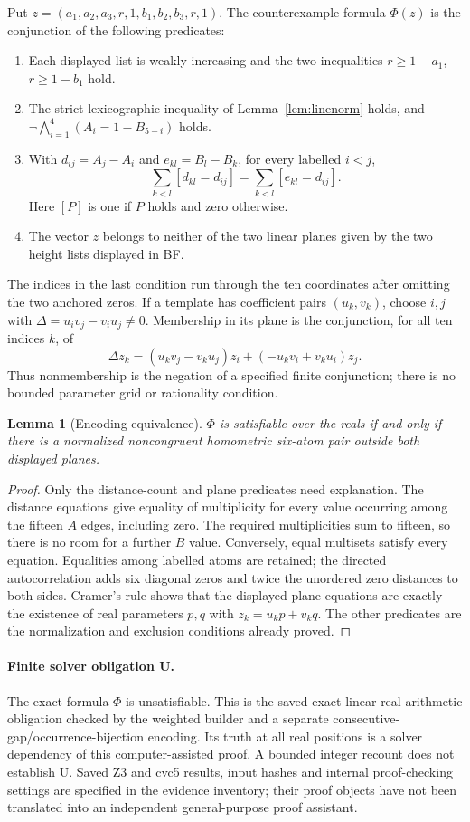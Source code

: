 \documentclass[11pt]{article}
\newtheorem{lemma}[theorem]{Lemma}
\theoremstyle{remark}
\begin{document}
Put $z=(a_1,a_2,a_3,r,1,b_1,b_2,b_3,r,1)$. The counterexample formula
$\Phi(z)$ is the conjunction of the following predicates:
\begin{enumerate}
\item Each displayed list is weakly increasing and the two inequalities
$r\ge1-a_1$, $r\ge1-b_1$ hold.
\item The strict lexicographic inequality of Lemma~\ref{lem:linenorm}
holds, and
$\neg\bigwedge_{i=1}^{4}(A_i=1-B_{5-i})$ holds.
\item With $d_{ij}=A_j-A_i$ and $e_{kl}=B_l-B_k$, for every labelled
$i<j$,
\[
 \sum_{k<l}[d_{kl}=d_{ij}]
   =\sum_{k<l}[e_{kl}=d_{ij}].
\]
Here $[P]$ is one if $P$ holds and zero otherwise.
\item The vector $z$ belongs to neither of the two linear planes given
by the two height lists displayed in BF.
\end{enumerate}
The indices in the last condition run through the ten coordinates after
omitting the two anchored zeros. If a template has coefficient pairs
$(u_k,v_k)$, choose $i,j$ with $\Delta=u_iv_j-v_iu_j\ne0$. Membership
in its plane is the conjunction, for all ten indices $k$, of
\[
 \Delta z_k=(u_kv_j-v_ku_j)z_i+(-u_kv_i+v_ku_i)z_j.
\]
Thus nonmembership is the negation of a specified finite conjunction;
there is no bounded parameter grid or rationality condition.

\begin{lemma}[Encoding equivalence]\label{lem:lineencode}
$\Phi$ is satisfiable over the reals if and only if there is a normalized
noncongruent homometric six-atom pair outside both displayed planes.
\end{lemma}
\begin{proof}
Only the distance-count and plane predicates need explanation. The
distance equations give equality of multiplicity for every value occurring
among the fifteen $A$ edges, including zero. The required multiplicities
sum to fifteen, so there is no room for a further $B$ value. Conversely,
equal multisets satisfy every equation. Equalities among labelled atoms
are retained; the directed autocorrelation adds six diagonal zeros and
twice the unordered zero distances to both sides. Cramer's rule shows
that the displayed plane equations are exactly the existence of real
parameters $p,q$ with $z_k=u_kp+v_kq$. The other predicates are the
normalization and exclusion conditions already proved.
\end{proof}

\paragraph{Finite solver obligation U.}
The exact formula $\Phi$ is unsatisfiable. This is the saved exact
linear-real-arithmetic obligation checked by the weighted builder and
a separate consecutive-gap/occurrence-bijection encoding. Its truth at
all real positions is a solver dependency of this computer-assisted
proof. A bounded integer recount does not establish U. Saved Z3 and
cvc5 results, input hashes and internal proof-checking settings are
specified in the evidence inventory; their proof objects have not been
translated into an independent general-purpose proof assistant.
\end{document}
